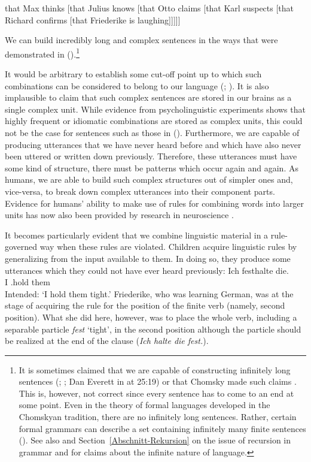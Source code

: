 \ea
\label{ex-that-max-thinks-that-recursion}
that Max thinks [that Julius knows [that Otto claims [that Karl suspects [that Richard confirms [that Friederike is laughing]]]]]
\z

\noindent
We can build incredibly long and complex sentences in the ways that were demonstrated in ().\footnote{
 It is sometimes claimed that we are capable of constructing infinitely long sentences (\citealp*[]{NKN2001a}; \citealp[]{KS2008a-u}; Dan Everett in  at 25:19) or that Chomsky made such claims \citep[]{Leiss2003a}. This is, however, not correct since every sentence
has to come to an end at some point. Even in the theory of formal languages developed in the Chomskyan
tradition, there are no infinitely long sentences. Rather, certain formal grammars can describe a
set containing infinitely many finite sentences (\citealp[]{Chomsky57a}). See also  and
 Section~\ref{Abschnitt-Rekursion} on the issue of recursion in grammar and for claims about the
 infinite nature of language.}


It would be arbitrary to establish some cut-off point up to which such combinations can
be considered to belong to our language (\citealp[]{Harris57a}; \citealp[]{Chomsky57a}). 
It is also implausible to claim that such complex sentences are stored in our brains as a single complex
unit. While evidence from psycholinguistic experiments shows that highly frequent or
idiomatic combinations are stored as complex units, this could not be the case for sentences such as
those in (). Furthermore, we are capable of producing utterances that we have never heard
before and which have also never been uttered or written down previously. Therefore, these utterances
must have some kind of structure, there must be patterns which occur again and again. As humans, we
are able to build such complex structures out of simpler ones and, vice-versa, to break down 
complex utterances into their component parts. Evidence for humans' ability to make use of rules for combining
words into larger units has now also been provided by research in neuroscience \citep[]{Pulvermueller2010a}.

It becomes particularly evident that we combine linguistic material in a rule-governed way when
these rules are violated. Children acquire linguistic rules by generalizing from
the input available to them. In doing so, they produce some utterances which they could not
have ever heard previously: 
\ea
\settowidth{}
\gll Ich festhalte die. \\
     I \particle.hold them\\
\glt Intended: `I hold them tight.'
\z
Friederike, who was learning German, was at the stage of acquiring the rule for the position of the finite
verb (namely, second position). What she did here, however, was to place the whole verb, including a
separable particle \emph{fest} `tight', in the second position although the particle should be realized at the end of
the clause (\emph{Ich halte die fest.}).

